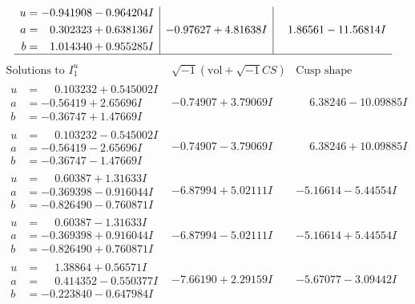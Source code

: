 \documentclass[1p]{elsarticle_modified}
\theoremstyle{definition}
\newcommand{\I}{\sqrt{-1}}
\begin{document}
$$\begin{array}{c|c|c}
\begin{aligned}
u &= -0.941908 - 0.964204 I \\
a &= \phantom{-}0.302323 + 0.638136 I \\
b &= \phantom{-}1.014340 + 0.955285 I\end{aligned}
 & -0.97627 + 4.81638 I & \phantom{-}1.86561 - 11.56814 I\\
 \hline 
 \end{array}$$\newpage$$\begin{array}{c|c|c}  
\text{Solutions to }I^u_{1}& \I (\text{vol} + \sqrt{-1}CS) & \text{Cusp shape}\\
 \hline 
\begin{aligned}
u &= \phantom{-}0.103232 + 0.545002 I \\
a &= -0.56419 + 2.65696 I \\
b &= -0.36747 + 1.47669 I\end{aligned}
 & -0.74907 + 3.79069 I & \phantom{-}6.38246 - 10.09885 I \\ \hline\begin{aligned}
u &= \phantom{-}0.103232 - 0.545002 I \\
a &= -0.56419 - 2.65696 I \\
b &= -0.36747 - 1.47669 I\end{aligned}
 & -0.74907 - 3.79069 I & \phantom{-}6.38246 + 10.09885 I \\ \hline\begin{aligned}
u &= \phantom{-}0.60387 + 1.31633 I \\
a &= -0.369398 - 0.916044 I \\
b &= -0.826490 - 0.760871 I\end{aligned}
 & -6.87994 + 5.02111 I & -5.16614 - 5.44554 I \\ \hline\begin{aligned}
u &= \phantom{-}0.60387 - 1.31633 I \\
a &= -0.369398 + 0.916044 I \\
b &= -0.826490 + 0.760871 I\end{aligned}
 & -6.87994 - 5.02111 I & -5.16614 + 5.44554 I \\ \hline\begin{aligned}
u &= \phantom{-}1.38864 + 0.56571 I \\
a &= \phantom{-}0.414352 - 0.550377 I \\
b &= -0.223840 - 0.647984 I\end{aligned}
 & -7.66190 + 2.29159 I & -5.67077 - 3.09442 I \\ \hline\begin{aligned}

\end{aligned}
\end{array}$$
\end{document}
